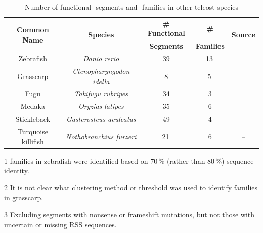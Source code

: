 \begin{table}[hb]
	\centering
	\begin{threeparttable}
	\centering
	\caption{Number of functional \vh-segments and \vh-families in other teleost species}
	\label{tab:teleost-vh-counts}
	\begin{tabular}{ccccc}\toprule
	\multirow{2}{*}{	\textbf{Common Name}} & \multirow{2}{*}{\textbf{Species}} & \textbf{\# Functional} & \textbf{	\# \vh} & \multirow{2}{*}{\textbf{Source}} \\
	& & \textbf{\vh Segments} & \textbf{Families} & \\\midrule
	Zebrafish & \textit{Danio rerio} & 39 & 13\,\tnote{1} & \parencite{magadan2015fishrepertoires} \\
	Grasscarp & \textit{Ctenopharyngodon idella} & 8 & 5\,\tnote{2} & \parencite{xiao2010grasscarp} \\
	Fugu & \textit{Takifugu rubripes} & 34 & 3 & \parencite{magadan2015fishrepertoires} \\
	Medaka & \textit{Oryzias latipes} & 35 & 6 & \parencite{fillatreau2013astonishing,magadan2011medaka} \\
	Stickleback & \textit{Gasterosteus aculeatus} & 49 & 4 & \parencite{magadan2015fishrepertoires} \\
	Turquoise killifish & \textit{Nothobranchius furzeri} & 21\,\tnote{3} & 6 & -- \\
	\bottomrule\end{tabular}
	\begin{tablenotes}
	\item[1] \vh families in zebrafish were identified based on 70\,\% (rather than 80\,\%) sequence identity.
	\item[2] It is not clear what clustering method or threshold was used to identify \vh families in grasscarp.
	\item[3] Excluding \vh segments with nonsense or frameshift mutations, but not those with uncertain or missing RSS sequences.
	\end{tablenotes}
	\end{threeparttable}
\end{table}
	
